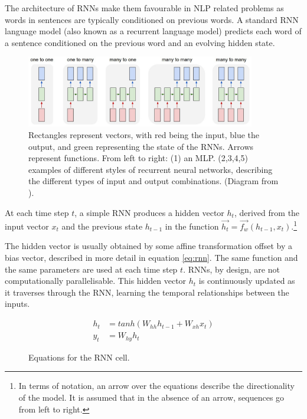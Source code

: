 \documentclass[12pt,twoside]{report}
\begin{document}
The architecture of RNNs make them favourable in NLP related problems as words in sentences are typically conditioned on previous words. A standard RNN language model (also known as a recurrent language model) predicts each word of a sentence conditioned on the previous word and an evolving hidden state.

\begin{figure}[!ht]
	\centering
	\includegraphics[width=100mm]{diagrams/rnn.jpeg}
	\caption{Rectangles represent vectors, with red being the input, blue the output, and green representing the state of the RNNs. Arrows represent  functions. From left to right: (1) an MLP. (2,3,4,5)  examples of different styles of recurrent neural networks, describing the different types of input and output combinations. (Diagram from \cite{karpathy_unreasonable_2015}). \label{rnn_shapes}} 
\end{figure}

At each time step $t$, a simple RNN produces a hidden vector $h_t$, derived from the input vector $x_t$ and the previous state $h_{t-1}$ in the function $\overrightarrow{h_t} = \overrightarrow{f_w}(h_{t-1}, x_t)$.\footnote{In terms of notation, an arrow over the equations describe the directionality of the model. It is assumed that in the absence of an arrow, sequences go from left to right.}

The hidden vector is usually obtained by some affine transformation offset by a bias vector, described in more detail in equation \ref{eq:rnn}. The same function and the same parameters are used at each time step $t$. RNNs, by design, are not computationally parallelisable. This hidden vector $h_t$ is continuously updated as it traverses through the RNN, learning the temporal relationships between the inputs.

\begin{figure}[!ht]
\begin{equation}
\label{eq:rnn}
\begin{aligned}
	h_t &= tanh(W_{hh}h_{t-1}+W_{xh}x_t)
\\
y_t &= W_{hy}h_t
\end{aligned}
\end{equation}
\captionsetup{labelformat=empty}
\caption{Equations for the RNN cell.}
\end{figure}
\end{document}
